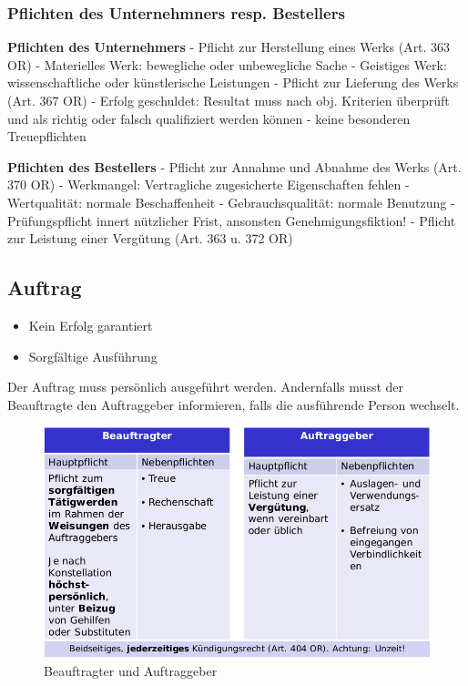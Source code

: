 \hypertarget{pflichten-des-unternehmners-resp.-bestellers}{%
\subsubsection{Pflichten des Unternehmners resp.
Bestellers}\label{pflichten-des-unternehmners-resp.-bestellers}}

\textbf{Pflichten des Unternehmers} - Pflicht zur Herstellung eines
Werks (Art. 363 OR) - Materielles Werk: bewegliche oder unbewegliche
Sache - Geistiges Werk: wissenschaftliche oder künstlerische Leistungen
- Pflicht zur Lieferung des Werks (Art. 367 OR) - Erfolg geschuldet:
Resultat muss nach obj. Kriterien überprüft und als richtig oder falsch
qualifiziert werden können - keine besonderen Treuepflichten

\textbf{Pflichten des Bestellers} - Pflicht zur Annahme und Abnahme des
Werks (Art. 370 OR) - Werkmangel: Vertragliche zugesicherte
Eigenschaften fehlen - Wertqualität: normale Beschaffenheit -
Gebrauchsqualität: normale Benutzung - Prüfungspflicht innert nützlicher
Frist, ansonsten Genehmigungsfiktion! - Pflicht zur Leistung einer
Vergütung (Art. 363 u. 372 OR)

\hypertarget{auftrag}{%
\subsection{Auftrag}\label{auftrag}}

\begin{itemize}
\tightlist
\item
  Kein Erfolg garantiert
\item
  Sorgfältige Ausführung
\end{itemize}

Der Auftrag muss persönlich ausgeführt werden. Andernfalls musst der
Beauftragte den Auftraggeber informieren, falls die ausführende Person
wechselt.

\begin{figure}
\centering
\includegraphics{figures/auftraggeberBeauftragter.png}
\caption{Beauftragter und Auftraggeber}
\end{figure}

